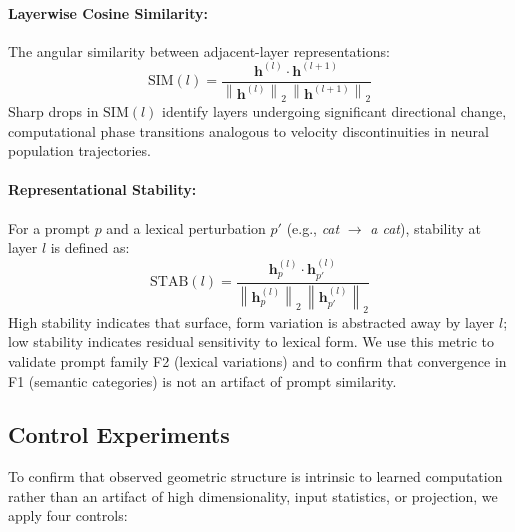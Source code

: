 \documentclass{article}
\begin{document}
\paragraph{Layerwise Cosine Similarity:} The angular similarity between adjacent-layer representations:
\begin{equation}
    \text{SIM}(l) = 
    \frac{\mathbf{h}^{(l)} \cdot \mathbf{h}^{(l+1)}}
         {\left\lVert\mathbf{h}^{(l)}\right\rVert_2 \, 
          \left\lVert\mathbf{h}^{(l+1)}\right\rVert_2}
\end{equation}
Sharp drops in $\text{SIM}(l)$ identify layers undergoing significant directional change, computational phase transitions analogous to velocity discontinuities in neural population trajectories.

\paragraph{Representational Stability:} For a prompt $p$ and a lexical perturbation $p'$ (e.g., \textit{cat} $\to$ \textit{a cat}), stability at layer $l$ is defined as:
\begin{equation}
    \text{STAB}(l) = 
    \frac{\mathbf{h}^{(l)}_p \cdot \mathbf{h}^{(l)}_{p'}}
         {\left\lVert\mathbf{h}^{(l)}_p\right\rVert_2 \, 
          \left\lVert\mathbf{h}^{(l)}_{p'}\right\rVert_2}
\end{equation}
High stability indicates that surface, form variation is abstracted away by layer $l$; low stability indicates residual sensitivity to lexical form. We use this metric to validate prompt family F2 (lexical variations) and to confirm that convergence in F1 (semantic categories) is not an artifact of prompt similarity.

\subsection{Control Experiments}
\label{subsec:controls}

To confirm that observed geometric structure is intrinsic to learned computation rather than an artifact of high dimensionality, input statistics, or projection, we apply four controls:
\end{document}
